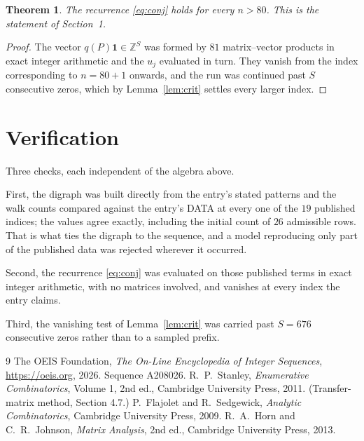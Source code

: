 \documentclass[11pt,a4paper]{article}
\theoremstyle{plain}
\newtheorem{theorem}{Theorem}
\theoremstyle{definition}
\begin{document}
\begin{theorem}
The recurrence \eqref{eq:conj} holds for every $n>80$. This is the statement of
Section~1.
\end{theorem}

\begin{proof}
The vector $q(P)\mathbf{1}\in\mathbb{Z}^{S}$ was formed by $81$ matrix--vector
products in exact integer arithmetic and the $u_j$ evaluated in turn. They vanish from the
index corresponding to $n=80+1$ onwards, and the run was continued past $S$ consecutive
zeros, which by Lemma~\ref{lem:crit} settles every larger index.
\end{proof}

\section{Verification}

Three checks, each independent of the algebra above.

First, the digraph was built directly from the entry's stated patterns and the walk counts
compared against the entry's DATA at every one of the $19$ published indices; the
values agree exactly, including the initial count of $26$ admissible rows. That is
what ties the digraph to the sequence, and a model reproducing only part of the published
data was rejected wherever it occurred.

Second, the recurrence \eqref{eq:conj} was evaluated on those published terms in exact
integer arithmetic, with no matrices involved, and vanishes at every index the entry claims.

Third, the vanishing test of Lemma~\ref{lem:crit} was carried past $S=676$ consecutive
zeros rather than to a sampled prefix.

\begin{thebibliography}{9}
 The OEIS Foundation, \emph{The On-Line Encyclopedia of Integer
Sequences}, \url{https://oeis.org}, 2026. Sequence A208026.
 R.~P.~Stanley, \emph{Enumerative Combinatorics}, Volume 1, 2nd ed.,
Cambridge University Press, 2011. (Transfer-matrix method, Section 4.7.)
 P.~Flajolet and R.~Sedgewick, \emph{Analytic Combinatorics}, Cambridge
University Press, 2009.
 R.~A.~Horn and C.~R.~Johnson, \emph{Matrix Analysis}, 2nd ed., Cambridge
University Press, 2013.
\end{thebibliography}
\end{document}
